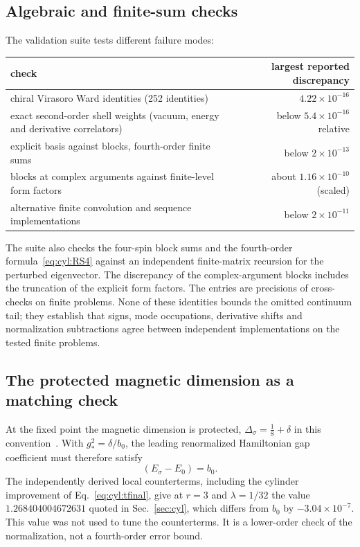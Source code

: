 \documentclass[11pt,a4paper]{article}
\numberwithin{equation}{section}
\newcommand{\Ds}{\Delta_\sigma}
\newcommand{\sci}[2]{#1\times10^{#2}}
\begin{document}
\subsection{Algebraic and finite-sum checks}\label{app:cyl:checks}
The validation suite tests different failure modes:
\begin{center}\small
\begin{tabular}{@{}>{\raggedright\arraybackslash}p{}r@{}}
\toprule
check & largest reported discrepancy\\
\midrule
chiral Virasoro Ward identities (252 identities) & $\sci{4.22}{-16}$\\
exact second-order shell weights (vacuum, energy and derivative correlators) & below $\sci{5.4}{-16}$ relative\\
explicit basis against blocks, fourth-order finite sums & below $\sci{2}{-13}$\\
blocks at complex arguments against finite-level form factors & about $\sci{1.16}{-10}$ (scaled)\\
alternative finite convolution and sequence implementations & below $\sci{2}{-11}$\\
\bottomrule
\end{tabular}
\end{center}
The suite also checks the four-spin block sums and the fourth-order formula~\eqref{eq:cyl:RS4} against an independent
finite-matrix recursion for the perturbed eigenvector. The discrepancy of the complex-argument blocks includes the
truncation of the explicit form factors. The entries are precisions of cross-checks on finite problems. None of these
identities bounds the omitted continuum tail; they establish that signs, mode occupations, derivative shifts and
normalization subtractions agree between independent implementations on the tested finite problems.

\subsection{The protected magnetic dimension as a matching check}\label{app:cyl:magnetic}
At the fixed point the magnetic dimension is protected, $\Ds=\frac18+\delta$ in this
convention~\cite{Behan:2017emf}. With $g_*^2=\delta/b_0$, the leading renormalized Hamiltonian gap coefficient must
therefore satisfy
\begin{equation}
 [g^2](E_\sigma-E_0)=b_0.
\end{equation}
The independently derived local counterterms, including the cylinder improvement of Eq.~\eqref{eq:cyl:tfinal}, give at
$r=3$ and $\lambda=1/32$ the value $1.268404004672631$ quoted in Sec.~\ref{sec:cyl}, which differs from $b_0$ by
$\sci{-3.04}{-7}$. This value was not used to tune the counterterms. It is a lower-order check of the normalization,
not a fourth-order error bound.
\end{document}
